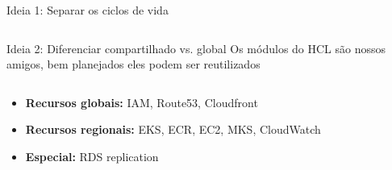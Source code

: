 \documentclass[aspectratio=169]{beamer}
\begin{document}
\begin{frame}{Ideia 1: Separar os ciclos de vida}
\begin{columns}[T]
\begin{column}[T]{5cm}
		\end{column}
	\end{columns}
	

	
\end{frame}

\begin{frame}{Ideia 2: Diferenciar compartilhado vs. global}
Os módulos do HCL são nossos amigos, bem planejados eles podem ser reutilizados
	
	\begin{columns}[T] %
		
		\begin{column}[T]{5cm} %
		
		\begin{itemize}
			\item \textbf{Recursos globais:} IAM, Route53, Cloudfront
			\item \textbf{Recursos regionais:} EKS, ECR, EC2, MKS, CloudWatch
			\item \textbf{Especial:} RDS replication
		\end{itemize}
		\end{column}
		\begin{column}[T]{5cm} %
				\begin{figure}
				\centering

\end{figure}
\end{column}
\end{columns}
\end{frame}
\end{document}
